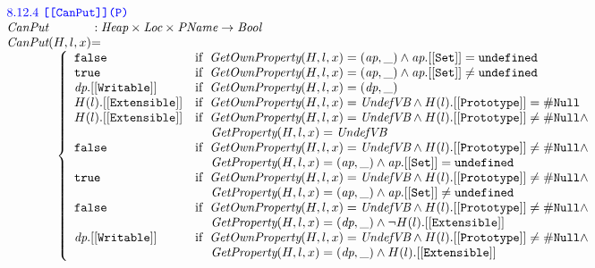 \[\begin{array}{l@{}c@{}l}
\multicolumn{3}{l}{\mbox{\inblue 8.12.4 {\tt [[CanPut]](P)}}}\\
\hf{CanPut} & :& \Heap \times \Loc \times \Prop \rightarrow \Bool \\
\hf{CanPut}(H,l,x) &=&\\
\multicolumn{3}{l}{
\rulesep\rulesep
\left\{\begin{array}{ll}
\false &\ifc{\hf{GetOwnProperty}(H,l,x) = (\emph{ap},\_) \wedge \emph{ap}.{\tt[[Set]]} = \undef}\\
\true &\ifc{\hf{GetOwnProperty}(H,l,x) = (\emph{ap},\_) \wedge \emph{ap}.{\tt[[Set]]} \not= \undef}\\
\hf{dp}.{\tt[[Writable]]} &\ifc{\hf{GetOwnProperty}(H,l,x) = (\emph{dp},\_)}\\
H(l).{\tt[[Extensible]]}
&\ifc{\hf{GetOwnProperty}(H,l,x) = \UndefVB\wedge H(l).{\tt[[Prototype]]} = \nullL}\\
H(l).{\tt[[Extensible]]}
&\ifc{\hf{GetOwnProperty}(H,l,x) = \UndefVB\wedge H(l).{\tt[[Prototype]]} \not= \nullL\wedge}\\
&\mbox{\phantom{ if\ }$\hf{GetProperty}(H,l,x)=\UndefVB$}\\
\false
&\ifc{\hf{GetOwnProperty}(H,l,x) = \UndefVB\wedge H(l).{\tt[[Prototype]]} \not= \nullL\wedge}\\
&\mbox{\phantom{ if\ }$\hf{GetProperty}(H,l,x)=(\emph{ap}, \_)\wedge
\emph{ap}.{\tt[[Set]]} = \undef$}\\
\true
&\ifc{\hf{GetOwnProperty}(H,l,x) = \UndefVB\wedge H(l).{\tt[[Prototype]]} \not= \nullL\wedge}\\
&\mbox{\phantom{ if\ }$\hf{GetProperty}(H,l,x)=(\emph{ap}, \_)\wedge
\emph{ap}.{\tt[[Set]]} \not= \undef$}\\
\false
&\ifc{\hf{GetOwnProperty}(H,l,x) = \UndefVB\wedge H(l).{\tt[[Prototype]]} \not= \nullL\wedge}\\
&\mbox{\phantom{ if\ }$\hf{GetProperty}(H,l,x)=(\emph{dp}, \_)\wedge
\neg H(l).{\tt[[Extensible]]}$}\\
\emph{dp}.{\tt[[Writable]]}
&\ifc{\hf{GetOwnProperty}(H,l,x) = \UndefVB\wedge H(l).{\tt[[Prototype]]} \not= \nullL\wedge}\\
&\mbox{\phantom{ if\ }$\hf{GetProperty}(H,l,x)=(\emph{dp}, \_)\wedge
H(l).{\tt[[Extensible]]}$}\\
\end{array}\right.
}
\\\\


\end{array}\]
